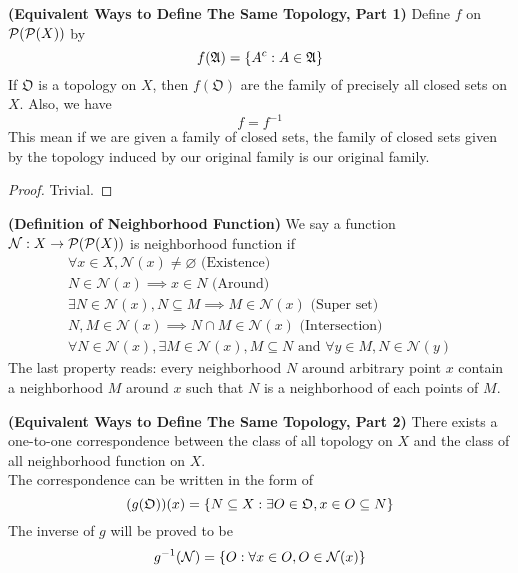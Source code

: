 \documentclass{report}
\begin{document}
\begin{theorem}
\label{2.1.3}
\textbf{(Equivalent Ways to Define The Same Topology, Part 1)} Define $f$ on $\mathcal{P}(\mathcal{P}(X))$ by 
\begin{equation}
f(\mathfrak{A})=\{ A^c:A\in \mathfrak{A} \}
\end{equation}
If $\mathfrak{O}$ is a topology on $X$, then  $f(\mathfrak{O})$ are the family of precisely all closed sets on $X$. Also, we have
\begin{equation}
f=f^{-1}
\end{equation}
This mean if we are given a family of closed sets, the family of closed sets given by the topology induced by our original family is our original family.   
\end{theorem}
\begin{proof}
Trivial. 
\end{proof}
\begin{definition}
\label{2.1.4}
\textbf{(Definition of Neighborhood Function)} We say a function $\mathcal{N}:X\rightarrow \mathcal{P}(\mathcal{P}(X))$ is neighborhood function if 
\begin{gather}
\forall x \in X,\mathcal{N}(x)\neq \varnothing\text{ (Existence) }\\
N \in \mathcal{N}(x)\implies x \in N\text{ (Around) }\\
\exists N \in \mathcal{N}(x), N\subseteq M\implies M\in \mathcal{N}(x)\text{ (Super set) }\\
N,M \in \mathcal{N}(x)\implies N \cap M\in \mathcal{N}(x)\text{ (Intersection) }\\
\forall N\in \mathcal{N}(x),\exists M\in \mathcal{N}(x), M \subseteq N\text{ and }\forall y \in M, N \in \mathcal{N}(y)
\end{gather}
The last property reads: every neighborhood $N$ around arbitrary point $x$ contain a neighborhood $M$ around $x$ such that $N$ is a neighborhood of each points of $M$.
\end{definition}
\begin{theorem}
\label{2.1.5}
\textbf{(Equivalent Ways to Define The Same Topology, Part 2)} There exists a one-to-one correspondence between the class of all topology on $X$ and the class of all neighborhood function on $X$.\\

The correspondence can be written in the form of 
\begin{equation} (g(\mathfrak{O}))(x)=\{ N\subseteq X: \exists O\in \mathfrak{O},x\in O\subseteq N \}
\end{equation}
The inverse of $g$ will be proved to be
 \begin{equation}
g^{-1}(\mathcal{N})=\{ O:\forall x \in O, O\in \mathcal{N}(x) \}
\end{equation}
\end{theorem}
\end{document}
